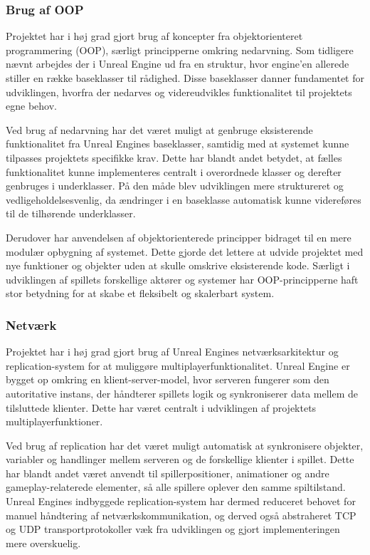 \subsubsection{Brug af OOP}
Projektet har i høj grad gjort brug af koncepter fra objektorienteret programmering (OOP), særligt principperne omkring nedarvning. Som tidligere nævnt arbejdes der i Unreal Engine ud fra en struktur, hvor engine’en allerede stiller en række baseklasser til rådighed. Disse baseklasser danner fundamentet for udviklingen, hvorfra der nedarves og videreudvikles funktionalitet til projektets egne behov.

Ved brug af nedarvning har det været muligt at genbruge eksisterende funktionalitet fra Unreal Engines baseklasser, samtidig med at systemet kunne tilpasses projektets specifikke krav. Dette har blandt andet betydet, at fælles funktionalitet kunne implementeres centralt i overordnede klasser og derefter genbruges i underklasser. På den måde blev udviklingen mere struktureret og vedligeholdelsesvenlig, da ændringer i en baseklasse automatisk kunne videreføres til de tilhørende underklasser.

Derudover har anvendelsen af objektorienterede principper bidraget til en mere modulær opbygning af systemet. Dette gjorde det lettere at udvide projektet med nye funktioner og objekter uden at skulle omskrive eksisterende kode. Særligt i udviklingen af spillets forskellige aktører og systemer har OOP-principperne haft stor betydning for at skabe et fleksibelt og skalerbart system.

\subsubsection{Netværk}
Projektet har i høj grad gjort brug af Unreal Engines netværksarkitektur og replication-system for at muliggøre multiplayerfunktionalitet. Unreal Engine er bygget op omkring en klient-server-model, hvor serveren fungerer som den autoritative instans, der håndterer spillets logik og synkroniserer data mellem de tilsluttede klienter. Dette har været centralt i udviklingen af projektets multiplayerfunktioner.

Ved brug af replication har det været muligt automatisk at synkronisere objekter, variabler og handlinger mellem serveren og de forskellige klienter i spillet. Dette har blandt andet været anvendt til spillerpositioner, animationer og andre gameplay-relaterede elementer, så alle spillere oplever den samme spiltilstand. Unreal Engines indbyggede replication-system har dermed reduceret behovet for manuel håndtering af netværkskommunikation, og derved også abstraheret TCP og UDP transportprotokoller væk fra udviklingen og gjort implementeringen mere overskuelig.

